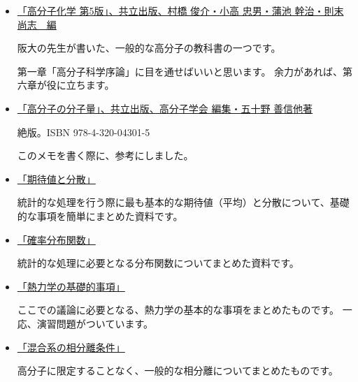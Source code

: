 \documentclass[uplatex,dvipdfmx,a4paper,11pt, titlepage]{jsarticle}
\begin{document}
\begin{itemize}
\item
\href{http://www.kyoritsu-pub.co.jp/bookdetail/9784320043800}{「高分子化学 第5版」、共立出版、村橋 俊介・小高 忠男・蒲池 幹治・則末 尚志　編}

阪大の先生が書いた、一般的な高分子の教科書の一つです。

第一章「高分子科学序論」に目を通せばいいと思います。
余力があれば、第六章が役に立ちます。

\item
\href{http://www.kyoritsu-pub.co.jp/bookdetail/9784320043015}{「高分子の分子量」、共立出版、高分子学会 編集・五十野 善信他著}

絶版。ISBN	978-4-320-04301-5

このメモを書く際に、参考にしました。

\item
\href{https://dl.dropboxusercontent.com/u/18899343/Probability/Kitaiti_Bunsan/EV_Var.pdf}{「期待値と分散」}

統計的な処理を行う際に最も基本的な期待値（平均）と分散について、基礎的な事項を簡単にまとめた資料です。

\item
\href{https://dl.dropboxusercontent.com/u/18899343/Probability/Prob_Dist/Prob_Dist.pdf}{「確率分布関数」}

統計的な処理に必要となる分布関数についてまとめた資料です。


\item
\href{https://dl.dropboxusercontent.com/u/18899343/Thermo_Dynamics/basics/Thermo_Dynamics_basics.pdf}{「熱力学の基礎的事項」}

ここでの議論に必要となる、熱力学の基本的な事項をまとめたものです。
一応、演習問題がついています。

\item
\href{https://dl.dropboxusercontent.com/u/18899343/physics/FreeEnergyForm/Free_Energy_Form.pdf}{「混合系の相分離条件」}

高分子に限定することなく、一般的な相分離についてまとめたものです。

%
%
%
%
%


\end{itemize}
\end{document}
